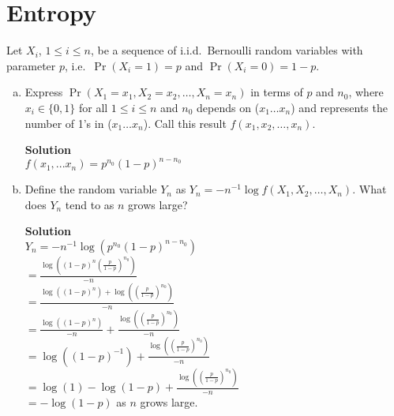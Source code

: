 \documentclass[11pt]{article}
\newcommand*{\Question}[1]{\section{#1}}
\newenvironment{Answer}{\vspace{10pt}\begin{mdframed}\textbf{Solution}\\}{\end{mdframed}\vfill\pagebreak[3]}
\newenvironment{Answer}{\vspace{10pt}}{\vfill\pagebreak[3]}
\begin{document}
\Question{Entropy}
Let $X_i$, $1 \leq i \leq n$, be a sequence of i.i.d.\ Bernoulli random variables with parameter $p$, i.e.\ $\Pr(X_i = 1) = p$ and $\Pr(X_i = 0) = 1-p$.
\begin{enumerate}[(a)]
  \item Express $\Pr(X_1 = x_1, X_2 = x_2, \dots, X_n = x_n)$ in terms of $p$ and $n_0$, where $x_i \in \{0,1 \}$ for all $1 \leq i \leq n$ and $n_0$ depends on ($x_1 \dots x_n$) and represents the number of 1's in ($x_1 \dots x_n$). Call this result $f(x_1, x_2, \dots, x_n)$.
  \begin{Answer}
$f(x_1,...x_n)=p^{n_0}(1-p)^{n-n_0}$
  \end{Answer}

  \item Define the random variable $Y_n$ as $Y_n = - n^{-1} \log f(X_1,X_2,\dots,X_n)$. What does $Y_n$ tend to as $n$ grows large?
  \begin{Answer}
$Y_n=-n^{-1}\log(p^{n_0}(1-p)^{n-n_0})$\\
$=\frac{\log((1-p)^n(\frac{p}{1-p})^{n_0})}{-n}$\\
$=\frac{\log((1-p)^n)+\log((\frac{p}{1-p})^{n_0})}{-n}$\\
$=\frac{\log((1-p)^n)}{-n}+\frac{\log((\frac{p}{1-p})^{n_0})}{-n}$\\
$=\log((1-p)^{-1})+\frac{\log((\frac{p}{1-p})^{n_0})}{-n}$\\
$=\log(1)-\log(1-p)+\frac{\log((\frac{p}{1-p})^{n_0})}{-n}$\\
$=-\log(1-p)$ as $n$ grows large.

  \end{Answer}
\end{enumerate}
\end{document}

